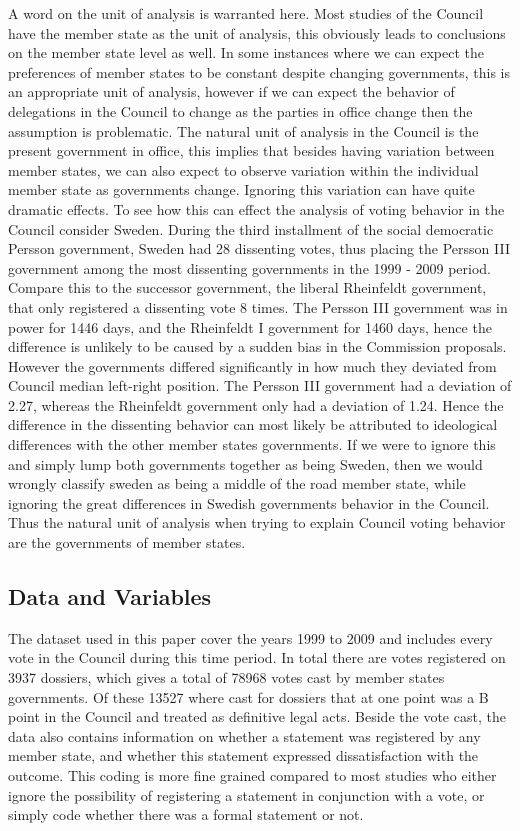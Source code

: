 A word on the unit of analysis is warranted here. Most studies of the Council have the member state as the unit of analysis, this obviously leads to conclusions on the member state level as well. In some instances where we can expect the preferences of member states to be constant despite changing governments, this is an appropriate unit of analysis, however if we can expect the behavior of delegations in the Council to change as the parties in office change then the assumption is problematic. The natural unit of analysis in the Council is the present government in office, this implies that besides having variation between member states, we can also expect to observe variation within the individual member state as governments change. Ignoring this variation can have quite dramatic effects. To see how this can effect the analysis of voting behavior in the Council consider Sweden. During the third installment of the social democratic Persson government, Sweden had 28 dissenting votes, thus placing the Persson III government among the most dissenting governments in the 1999 - 2009 period. Compare this to the successor government, the liberal Rheinfeldt government, that only registered a dissenting vote 8 times. The Persson III government was in power for 1446 days, and the Rheinfeldt I government for 1460 days, hence the difference is unlikely to be caused by a sudden bias in the Commission proposals. However the governments differed significantly in how much they deviated from Council median left-right position. The Persson III government had a deviation of 2.27, whereas the Rheinfeldt government only had a deviation of 1.24. Hence the difference in the dissenting behavior can most likely be attributed to ideological differences with the other member states governments. If we were to ignore this and simply lump both governments together as being Sweden, then we would wrongly classify sweden as being a middle of the road member state, while ignoring the great differences in Swedish governments behavior in the Council. Thus the natural unit of analysis when trying to explain Council voting behavior are the governments of member states. 


\subsection{Data and Variables}
The dataset used in this paper cover the years 1999 to 2009 and includes every vote in the Council during this time period. In total there are votes registered on 3937 dossiers, which gives a total of 78968 votes cast by member states governments. Of these 13527 where cast for dossiers that at one point was a B point in the Council and treated as definitive legal acts. Beside the vote cast, the data also contains information on whether a statement was registered by any member state, and whether this statement expressed dissatisfaction with the outcome. This coding is more fine grained compared to most studies who either ignore the possibility of registering a statement in conjunction with a vote, or simply code whether there was a formal statement or not.

